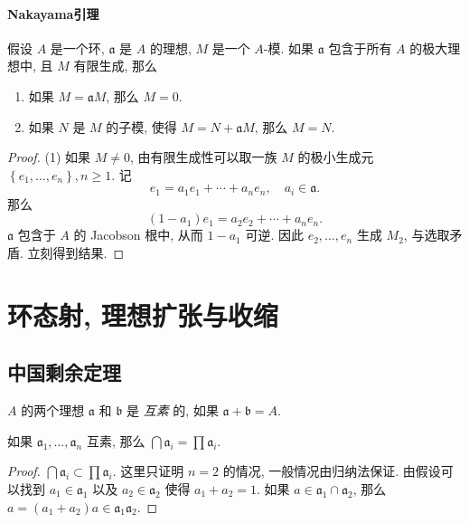 \paragraph{Nakayama引理}

\begin{theorem}[Nakayama引理]
  \label{theorem-Nakayama-lemma}
  假设 \( A \) 是一个环, \( \mathfrak{a} \) 是 \( A \) 的理想, \( M \) 是一个 \(
  A\)-模. 如果 \( \mathfrak{a} \) 包含于所有 \( A \) 的极大理想中, 且 \( M \)
  有限生成, 那么
  \begin{enumerate}
    \item 如果 \( M = \mathfrak{a} M \), 那么 \( M = 0 \).
    \item 如果 \( N \) 是 \( M \) 的子模, 使得 \( M = N + \mathfrak{a} M \),
      那么 \( M = N \).
  \end{enumerate}
\end{theorem}
\begin{proof}
  (1) 如果 \( M \neq 0 \), 由有限生成性可以取一族 \( M \) 的极小生成元 \(
  \left\lbrace e_1, \ldots, e_n \right\rbrace, n \geq 1 \).
  记
  \[
    e_1 = a_1 e_1 + \cdots + a_n e_n,\quad a_i \in \mathfrak{a}.
  \]
  那么
  \[
    (1 - a_1) e_1 = a_2 e_2 + \cdots + a_n e_n.
  \]
  \( \mathfrak{a} \) 包含于 \( A \) 的 Jacobson 根中, 从而 \( 1 - a_1 \) 可逆.
  因此 \( e_2, \ldots, e_n \) 生成 \( M_2 \), 与选取矛盾.
  立刻得到结果.
\end{proof}

\section{环态射, 理想扩张与收缩}

\subsection{中国剩余定理}

\( A \) 的两个理想 \( \mathfrak{a} \) 和 \( \mathfrak{b} \) 是 \emph{互素} 的,
如果 \( \mathfrak{a} + \mathfrak{b} = A \).
\begin{proposition}
  如果 \( \mathfrak{a}_1,\ldots, \mathfrak{a}_n \) 互素, 那么 \( \bigcap
  \mathfrak{a}_i = \prod \mathfrak{a}_i \).
\end{proposition}
\begin{proof}
  \( \bigcap \mathfrak{a}_i \subset \prod \mathfrak{a}_i \).
  这里只证明 \( n = 2 \) 的情况, 一般情况由归纳法保证.
  由假设可以找到 \( a_1 \in \mathfrak{a}_1 \) 以及 \( a_2 \in \mathfrak{a}_2 \)
  使得 \( a_1 + a_2 = 1 \). 如果 \( a \in \mathfrak{a}_1 \cap \mathfrak{a}_2 \),
  那么 \( a = (a_1 + a_2)a \in \mathfrak{a}_1 \mathfrak{a}_2 \).
\end{proof}

